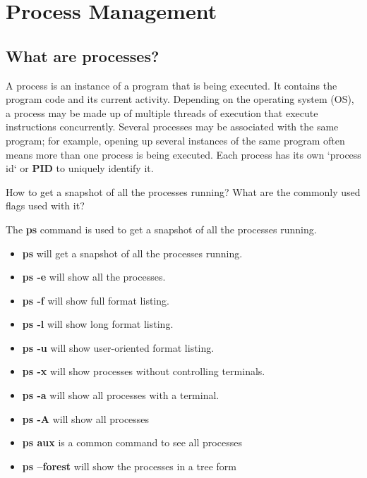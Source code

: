 \setchapterpreamble[u]{\margintoc}
\chapter{Process Management}

\section{What are processes?}

\begin{definition}[Process]
  A process is an instance of a program that is being executed.
  It contains the program code and its current activity.
  Depending on the operating system (OS), a process may be made up of
  multiple threads of execution that execute instructions concurrently.
  Several processes may be associated with the same program; for example,
  opening up several instances of the same program often means more than
  one process is being executed.
  Each process has its own `process id` or \textbf{PID} to uniquely identify it.
\end{definition}


\begin{qs}
  How to get a snapshot of all the processes running?
  What are the commonly used flags used with it?
\end{qs}

\begin{ans}
  The \textbf{ps} command is used to get a snapshot of all the processes running.
  \begin{itemize}
    \item \textbf{ps} will get a snapshot of all the processes running.
    \item \textbf{ps -e} will show all the processes.
    \item \textbf{ps -f} will show full format listing.
    \item \textbf{ps -l} will show long format listing.
    \item \textbf{ps -u} will show user-oriented format listing.
    \item \textbf{ps -x} will show processes without controlling terminals.
    \item \textbf{ps -a} will show all processes with a terminal.
    \item \textbf{ps -A} will show all processes
    \item \textbf{ps aux} is a common command to see all processes
    \item \textbf{ps --forest} will show the processes in a tree form
  \end{itemize}
\end{ans}

